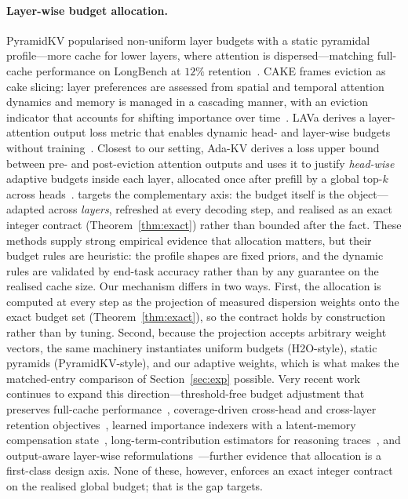 \paragraph{Layer-wise budget allocation.}
PyramidKV popularised non-uniform layer budgets with a static pyramidal
profile---more cache for lower layers, where attention is
dispersed---matching full-cache performance on LongBench at $12\%$
retention~\cite{cai2024pyramidkv}. CAKE frames eviction as cake slicing:
layer preferences are assessed from spatial and temporal attention
dynamics and memory is managed in a cascading manner, with an eviction
indicator that accounts for shifting importance over
time~\cite{qin2025cake}. LAVa derives a layer-attention output loss
metric that enables dynamic head- and layer-wise budgets without
training~\cite{shen2025lava}. Closest to our setting, Ada-KV derives a
loss upper bound between pre- and post-eviction attention outputs and
uses it to justify \emph{head-wise} adaptive budgets inside each layer,
allocated once after prefill by a global top-$k$ across
heads~\cite{feng2025adakv}. \sage{} targets the complementary axis: the
budget itself is the object---adapted across \emph{layers}, refreshed at
every decoding step, and realised as an exact integer contract
(Theorem~\ref{thm:exact}) rather than bounded after the fact. These
methods supply strong empirical
evidence that allocation matters, but their budget rules are heuristic:
the profile shapes are fixed priors, and the dynamic rules are validated
by end-task accuracy rather than by any guarantee on the realised cache
size. Our \laba{} mechanism differs in two ways. First, the allocation is
computed at every step as the projection of measured dispersion weights
onto the exact budget set (Theorem~\ref{thm:exact}), so the contract holds
by construction rather than by tuning. Second, because the projection
accepts arbitrary weight vectors, the same machinery instantiates uniform
budgets (H2O-style), static pyramids (PyramidKV-style), and our adaptive
weights, which is what makes the matched-entry comparison of
Section~\ref{sec:exp} possible. Very recent work continues to expand this
direction---threshold-free budget adjustment that preserves full-cache
performance~\cite{ni2025refreekv}, coverage-driven cross-head and
cross-layer retention objectives~\cite{roy2026kvec}, learned importance
indexers with a latent-memory compensation
state~\cite{yang2026indexmem}, long-term-contribution estimators for
reasoning traces~\cite{dong2026foresightkv}, and output-aware layer-wise
reformulations~\cite{mai2026laprox}---further evidence that allocation is
a first-class design axis. None of these, however, enforces an exact
integer contract on the realised global budget; that is the gap \sage{}
targets.

